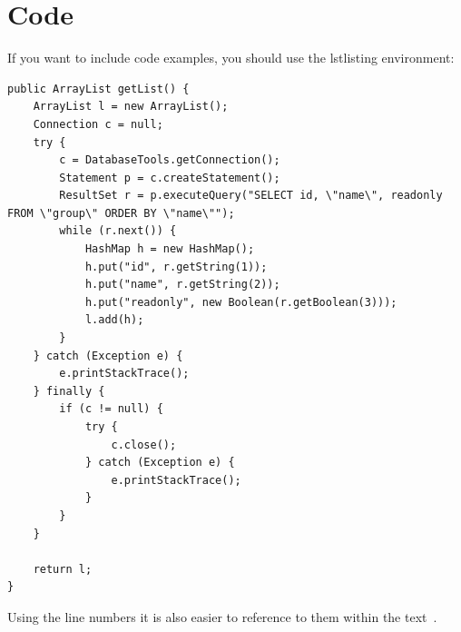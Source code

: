 \section{Code}
If you want to include code examples, you should use the lstlisting environment: 

{\small
\begin{lstlisting}[caption=A listing example]
public ArrayList getList() {	
	ArrayList l = new ArrayList();
	Connection c = null;
	try {
		c = DatabaseTools.getConnection();
		Statement p = c.createStatement();
		ResultSet r = p.executeQuery("SELECT id, \"name\", readonly FROM \"group\" ORDER BY \"name\"");
		while (r.next()) {
			HashMap h = new HashMap();
			h.put("id", r.getString(1));
			h.put("name", r.getString(2));
			h.put("readonly", new Boolean(r.getBoolean(3)));
			l.add(h);
		}
	} catch (Exception e) {
		e.printStackTrace();
	} finally {
		if (c != null) {
			try {
				c.close();
			} catch (Exception e) {
				e.printStackTrace();
			}
		}
	}
	
	return l;
}
\end{lstlisting}
}

Using the line numbers it is also easier to reference to them within the text~\cite{Maps2014}.